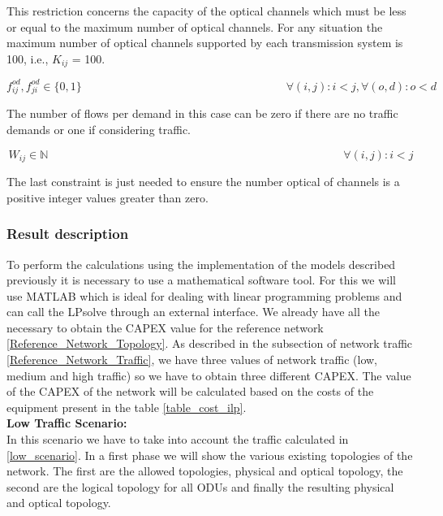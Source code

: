 This restriction concerns the capacity of the optical channels which must be less or equal to the maximum number of optical channels. For any situation the maximum number of optical channels supported by each transmission system is 100, i.e., $K_{ij}$ = 100.

\begin{equation}
f_{ij}^{od} , f_{ji}^{od} \in \{0,1\}   \qquad \qquad \qquad \qquad \qquad \qquad \qquad \qquad \qquad
\forall(i,j) : i < j, \forall(o,d) : o < d
\label{ILPOpaque6_Surv}
\end{equation}

The number of flows per demand in this case can be zero if there are no traffic demands or one if considering traffic.

\begin{equation}
W_{ij} \in \mathbb{N}  \qquad \qquad \qquad \qquad \qquad \qquad \qquad \qquad \qquad \qquad \qquad \qquad \qquad
\forall(i,j) : i < j
\label{ILPOpaque7_Surv}
\end{equation}

The last constraint is just needed to ensure the number optical of channels is a positive integer values greater than zero.


\subsubsection{Result description}

To perform the calculations using the implementation of the models described previously it is necessary to use a mathematical software tool. For this we will use MATLAB which is ideal for dealing with linear programming problems and can call the LPsolve through an external interface.
We already have all the necessary to obtain the CAPEX value for the reference network \ref{Reference_Network_Topology}. As described in the subsection of network traffic \ref{Reference_Network_Traffic}, we have three values of network traffic (low, medium and high traffic) so we have to obtain three different CAPEX.
The value of the CAPEX of the network will be calculated based on the costs of the equipment present in the table \ref{table_cost_ilp}.\\


\textbf{Low Traffic Scenario:}\\

In this scenario we have to take into account the traffic calculated in \ref{low_scenario}. In a first phase we will show the various existing topologies of the network. The first are the allowed topologies, physical and optical topology, the second are the logical topology for all ODUs and finally the resulting physical and optical topology.\\

